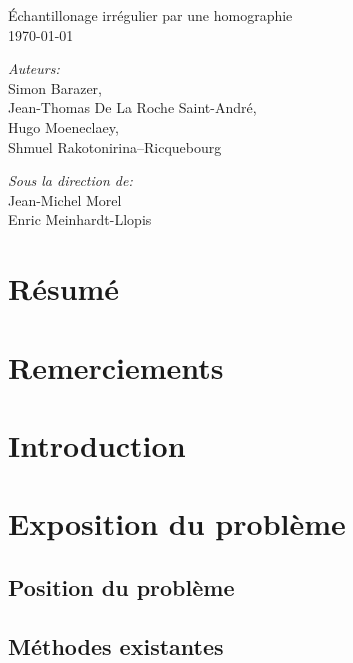 \documentclass[a4paper,11pt]{article}
\theoremstyle{plain}
\theoremstyle{definition}
\theoremstyle{remark}
\begin{document}
   	\begin{titlepage}
	\begin{center}
	\vspace*{\fill}

		\vspace{0.3cm}
		{\huge Échantillonage irrégulier par une homographie}\\
		\vspace{1.5cm}
	\today
	\vspace{1.5cm}


		\large
			\emph{Auteurs:}\\
			Simon Barazer,\\
			Jean-Thomas De La Roche Saint-André,\\
			Hugo Moeneclaey, \\
			Shmuel Rakotonirina--Ricquebourg
		
\medbreak
\medbreak
\medbreak
\medbreak
\medbreak
\medbreak

		\large
			\emph{Sous la direction de:}\\ 
			Jean-Michel Morel \\
			Enric Meinhardt-Llopis
		


	\vfill
	\end{center}
   	\section*{Résumé}
   		
	\end{titlepage}
	\tableofcontents
		\section*{Remerciements}
	\section*{Introduction}%
		
	\section{Exposition du problème}
		\label{Exposition_du_probleme}
		\subsection{Position du problème}
		\subsection{Méthodes existantes}
\end{document}
